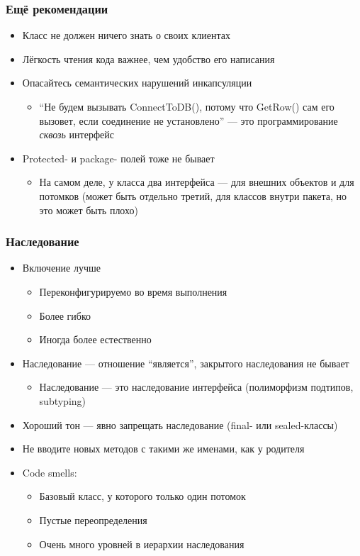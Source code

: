 \documentclass[xetex,mathserif,serif]{beamer}
\begin{document}
    \begin{frame}
        \frametitle{Ещё рекомендации}
        \begin{itemize}
            \item Класс не должен ничего знать о своих клиентах
            \item Лёгкость чтения кода важнее, чем удобство его написания
            \item Опасайтесь семантических нарушений инкапсуляции
            \begin{itemize}
                \item ``Не будем вызывать ConnectToDB(), потому что GetRow() сам его вызовет, если соединение не установлено'' --- это программирование \textit{сквозь} интерфейс
            \end{itemize}
            \item Protected- и package- полей тоже не бывает
            \begin{itemize}
                \item На самом деле, у класса два интерфейса --- для внешних объектов и для потомков (может быть отдельно третий, для классов внутри пакета, но это может быть плохо)
            \end{itemize}
        \end{itemize}
    \end{frame}

    \begin{frame}
        \frametitle{Наследование}
        \begin{itemize}
            \item Включение лучше
            \begin{itemize}
                \item Переконфигурируемо во время выполнения
                \item Более гибко
                \item Иногда более естественно
            \end{itemize}
            \item Наследование --- отношение ``является'', закрытого наследования не бывает
            \begin{itemize}
                \item Наследование --- это наследование интерфейса (полиморфизм подтипов, subtyping)
            \end{itemize}
            \item Хороший тон --- явно запрещать наследование (final- или sealed-классы)
            \item Не вводите новых методов с такими же именами, как у родителя
            \item Code smells:
            \begin{itemize}
                \item Базовый класс, у которого только один потомок
                \item Пустые переопределения
                \item Очень много уровней в иерархии наследования
            \end{itemize}
        \end{itemize}
    \end{frame}
\end{document}
